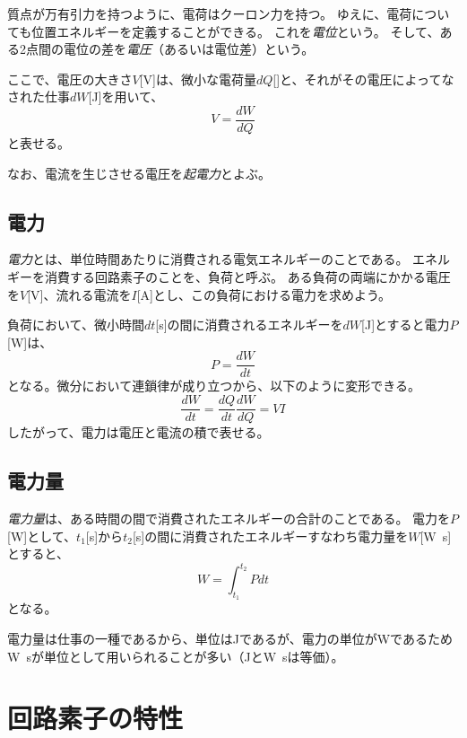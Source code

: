 \documentclass{ltjsreport}
\begin{document}
質点が万有引力を持つように、電荷はクーロン力を持つ。
ゆえに、電荷についても位置エネルギーを定義することができる。
これを\emph{電位}という。
そして、ある2点間の電位の差を\emph{電圧}（あるいは電位差）という。

ここで、電圧の大きさ$V$[\si{\V}]は、微小な電荷量$dQ$[\si{\C}]と、それがその電圧によってなされた仕事$dW$[\si{\J}]を用いて、
\begin{equation}
    V = \frac{dW}{dQ}
\end{equation}
と表せる。

なお、電流を生じさせる電圧を\emph{起電力}とよぶ。

\section{電力}

\emph{電力}とは、単位時間あたりに消費される電気エネルギーのことである。
エネルギーを消費する回路素子のことを、負荷と呼ぶ。
ある負荷の両端にかかる電圧を$V$[\si{\V}]、流れる電流を$I$[\si{\A}]とし、この負荷における電力を求めよう。

負荷において、微小時間$dt$[\si{s}]の間に消費されるエネルギーを$dW$[\si{J}]とすると電力$P$[\si{\W}]は、
\begin{equation}
    P = \frac{dW}{dt}
\end{equation}
となる。微分において連鎖律が成り立つから、以下のように変形できる。
\begin{equation}
    \frac{dW}{dt} = \frac{dQ}{dt}\frac{dW}{dQ} = VI
\end{equation}
したがって、電力は電圧と電流の積で表せる。

\section{電力量}

\emph{電力量}は、ある時間の間で消費されたエネルギーの合計のことである。
電力を$P$[\si{\W}]として、$t_1$[\si{\s}]から$t_2$[\si{\s}]の間に消費されたエネルギーすなわち電力量を$W$[\si{\W\s}]とすると、
\begin{equation}
    W = \int_{t_1}^{t_2} P dt
\end{equation}
となる。

電力量は仕事の一種であるから、単位は\si{\J}であるが、電力の単位が\si{\W}であるため\si{\W\s}が単位として用いられることが多い（\si{\J}と\si{\W\s}は等価）。

\chapter{回路素子の特性}
\end{document}

